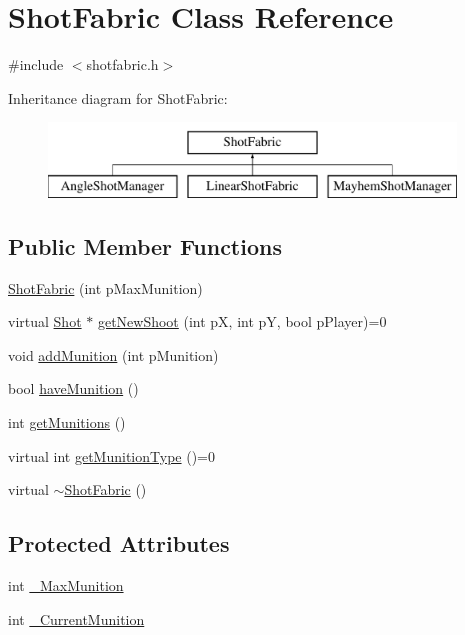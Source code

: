 \hypertarget{class_shot_fabric}{\section{Shot\-Fabric Class Reference}
\label{class_shot_fabric}
}


{\ttfamily \#include $<$shotfabric.\-h$>$}

Inheritance diagram for Shot\-Fabric\-:\begin{figure}[H]
\begin{center}
\leavevmode
\includegraphics[height=2.000000cm]{class_shot_fabric}
\end{center}
\end{figure}
\subsection*{Public Member Functions}
\begin{DoxyCompactItemize}
\item 
\hyperlink{class_shot_fabric_af16f37a0f8bd2d7c92adc41af55d35fa}{Shot\-Fabric} (int p\-Max\-Munition)
\item 
virtual \hyperlink{class_shot}{Shot} $\ast$ \hyperlink{class_shot_fabric_a08f334290a4ef5dfd67964c35467344f}{get\-New\-Shoot} (int p\-X, int p\-Y, bool p\-Player)=0
\item 
void \hyperlink{class_shot_fabric_a5cf24e648d9bb4dcafe30be3df7e64f8}{add\-Munition} (int p\-Munition)
\item 
bool \hyperlink{class_shot_fabric_a1f09703a48a7dc51c177dab863c14a17}{have\-Munition} ()
\item 
int \hyperlink{class_shot_fabric_a733c2e929d1ac1a30453e32af1874cbe}{get\-Munitions} ()
\item 
virtual int \hyperlink{class_shot_fabric_a5744630f76e016e21ba141bd182d16ad}{get\-Munition\-Type} ()=0
\item 
virtual \hyperlink{class_shot_fabric_ab3c68286b83cc23b86914b0c914195fd}{$\sim$\-Shot\-Fabric} ()
\end{DoxyCompactItemize}
\subsection*{Protected Attributes}
\begin{DoxyCompactItemize}
\item 
int \hyperlink{class_shot_fabric_a89ed1c6e673c23fa50018dd06d867a66}{\-\_\-\-Max\-Munition}
\item 
int \hyperlink{class_shot_fabric_a5863cbc4e51a089b3e87a1afd77629ba}{\-\_\-\-Current\-Munition}
\end{DoxyCompactItemize}



